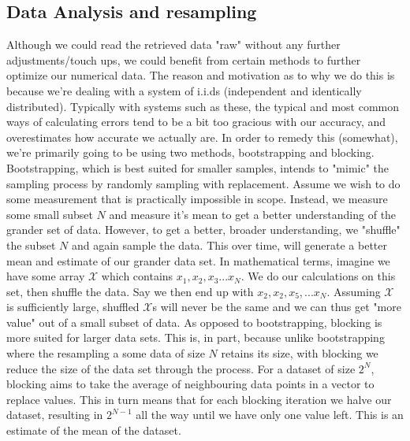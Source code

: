 \documentclass{article}
\begin{document}
\subsection{Data Analysis and resampling} \label{blo}
Although we could read the retrieved data "raw" without any further adjustments/touch ups, we could benefit from certain methods to further optimize our numerical data. The reason and motivation as to why we do this is because we're dealing with a system of i.i.ds (independent and identically distributed). Typically with systems such as these, the typical and most common ways of calculating errors tend to be a bit too gracious with our accuracy, and overestimates how accurate we actually are. In order to remedy this (somewhat), we're primarily going to be using two methods, bootstrapping and blocking. 
\newline Bootstrapping, which is best suited for smaller samples, intends to "mimic" the sampling process by randomly sampling with replacement. Assume we wish to do some measurement that is practically impossible in scope. Instead, we measure some small subset $N$ and measure it's mean to get a better understanding of the grander set of data. However, to get a better, broader understanding, we "shuffle" the subset $N$ and again sample the data. This over time, will generate a better mean and estimate of our grander data set.
\newline In mathematical terms, imagine we have some array $\mathcal{X}$ which contains $x_1, x_2, x_3 ... x_N$. We do our calculations on this set, then shuffle the data. Say we then end up with $x_2, x_2, x_5, ... x_N$. Assuming $\mathcal{X}$ is sufficiently large, shuffled $\mathcal{X}$s will never be the same and we can thus get "more value" out of a small subset of data.
\newline
As opposed to bootstrapping, blocking is more suited for larger data sets. This is, in part, because unlike bootstrapping where the resampling a some data of size $N$ retains its size, with blocking we reduce the size of the data set through the process. For a dataset of size $2^N$, blocking aims to take the average of neighbouring data points in a vector to replace values. This in turn means that for each blocking iteration we halve our dataset, resulting in $2^{N-1}$ all the way until we have only one value left. This is an estimate of the mean of the dataset.
\end{document}
